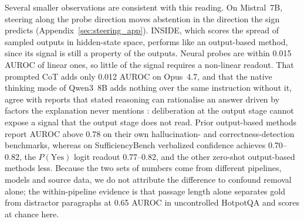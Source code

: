 \documentclass[acmsmall,screen,review]{acmart}
\newcommand{\bench}{SufficiencyBench}
\begin{document}
Several smaller observations are consistent with this reading. On Mistral~7B, steering along the probe direction moves abstention in the direction the sign predicts (Appendix~\ref{sec:steering_app}). INSIDE, which scores the spread of sampled outputs in hidden-state space, performs like an output-based method, since its signal is still a property of the outputs. Neural probes are within 0.015 AUROC of linear ones, so little of the signal requires a non-linear readout. That prompted CoT adds only 0.012 AUROC on Opus~4.7, and that the native thinking mode of Qwen3~8B adds nothing over the same instruction without it, agree with reports that stated reasoning can rationalise an answer driven by factors the explanation never mentions \citep{turpin2023unfaithful}: deliberation at the output stage cannot expose a signal that the output stage does not read. Prior output-based methods report AUROC above 0.78 on their own hallucination- and correctness-detection benchmarks, whereas on \bench{} verbalized confidence achieves 0.70--0.82, the $P(\text{Yes})$ logit readout 0.77--0.82, and the other zero-shot output-based methods less. Because the two sets of numbers come from different pipelines, models and source data, we do not attribute the difference to confound removal alone; the within-pipeline evidence is that passage length alone separates gold from distractor paragraphs at 0.65 AUROC in uncontrolled HotpotQA and scores at chance here.
\end{document}
